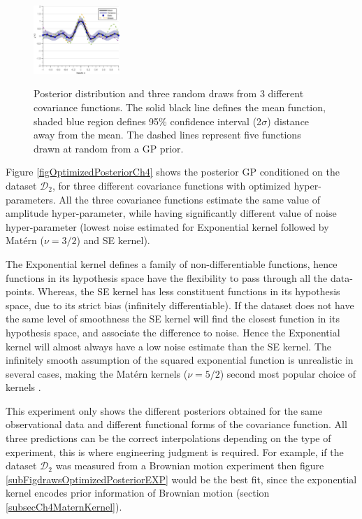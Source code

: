 \begin{figure}[!ht]
  {
        \includegraphics[width=0.29\textwidth]
        {images/part2/drawsPosteriorSE}
        \label{subFigdrawsPosteriorSE}
  }\quad
\caption{Posterior distribution and three random draws from 3 different covariance functions. The solid black line defines the mean function, shaded blue region defines 95\% confidence interval (2$\sigma$) distance away from the mean. The dashed lines represent five functions drawn at random from a GP prior. }
       \label{figpreOptimizedPosteriorCh5}
\end{figure}

\begin{mdframed}[hidealllines=true,backgroundcolor=lightgray!20]
Figure \ref{figOptimizedPosteriorCh4} shows the posterior GP conditioned on the dataset $\mathcal{D}_{2}$, for three different covariance functions with optimized hyper-parameters. All the three covariance functions estimate the same value of amplitude hyper-parameter, while having significantly different value of noise hyper-parameter (lowest noise estimated for Exponential kernel followed by Mat\'ern ($\nu=3/2$) and SE kernel). 

The Exponential kernel defines a family of non-differentiable functions, hence functions in its hypothesis space have the flexibility to pass through all the data-points. Whereas, the SE kernel has less  constituent functions in its hypothesis space, due to its strict bias (infinitely differentiable). If the dataset does not have the same level of smoothness the SE kernel will find the closest function in its hypothesis space, and associate the difference to noise. Hence the Exponential kernel will almost always have a low noise estimate than the SE kernel. The infinitely smooth assumption of the squared exponential function is unrealistic in several cases, making the Mat\'ern kernels ($\nu=5/2$) second most popular choice of kernels \cite{Stein1999Springer, cornford2002modelling}. 

This experiment only shows the different posteriors obtained for the same observational data and different functional forms of the covariance function. All three predictions can be the correct interpolations depending on the type of experiment, this is where engineering judgment is required. For example, if the dataset $\mathcal{D}_{2}$ was measured from a Brownian motion experiment then figure \ref{subFigdrawsOptimizedPosteriorEXP} would be the best fit, since the exponential kernel encodes prior information of Brownian motion (section \ref{subsecCh4MaternKernel}).

\end{mdframed}

